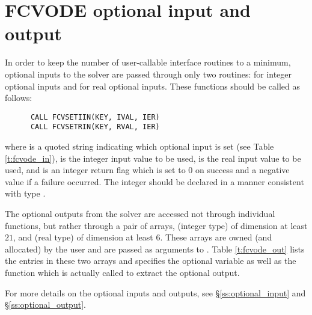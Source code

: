 \section{FCVODE optional input and output}\label{fcv_opt_inout}

In order to keep the number of user-callable {\fcvode} interface routines to
a minimum, optional inputs to the {\cvode} solver are passed through only
two routines:  for integer optional inputs and 
for real optional inputs. These functions should be called as follows:
\begin{verbatim}
      CALL FCVSETIIN(KEY, IVAL, IER)
      CALL FCVSETRIN(KEY, RVAL, IER)
\end{verbatim}
where  is a quoted string indicating which optional input is set
(see Table \ref{t:fcvode_in}),
 is the integer input value to be used,
 is the real input value to be used, and
 is an integer return flag which is set to $0$ on success and 
a negative value if a failure occurred.
The integer  should be declared in a manner consistent with {\CC}
type .

The optional outputs from the {\cvode} solver are accessed not through
individual functions, but rather through a pair of arrays, 
(integer type) of dimension at least $21$, and  (real type) of
dimension at least $6$.  These arrays are owned (and allocated) by the user
and are passed as arguments to .
Table \ref{t:fcvode_out} lists the entries in these two arrays and specifies the
optional variable as well as the {\cvode} function which is actually called to
extract the optional output.

For more details on the optional inputs and outputs, see \S\ref{ss:optional_input}
and \S\ref{ss:optional_output}.

